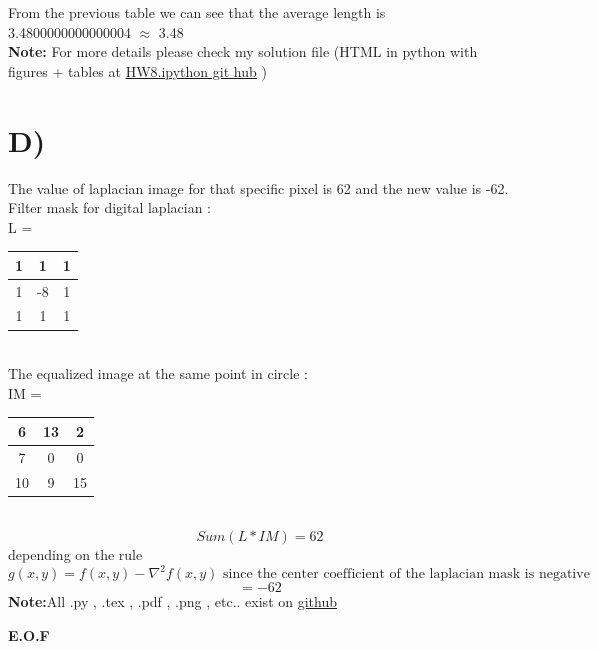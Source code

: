 \documentclass{article}
\begin{document}
From the previous table we can see that the average length is 3.4800000000000004 \(\approx\) 3.48\\
\textbf{Note:} For more details please check my solution file (HTML in python with figures + tables at \href{https://github.com/aqeel13932/IP/blob/master/hw8/HW8.ipynb}{HW8.ipython git hub} )
\section*{D)}
The value of laplacian image for that specific pixel is  62 and the new value is -62.\\
Filter mask for digital laplacian : \\
L = 
\begin{tabular}{|c|c|c|}
\hline
1&1&1 \\ \hline
1&-8&1 \\ \hline
1& 1&1 \\ \hline
\end{tabular} \\
The equalized image at the same point in circle : \\
IM = 
\begin{tabular}{|c|c|c|}
\hline
6&13&2 \\ \hline
7&0&0 \\ \hline
10&9&15 \\ \hline
\end{tabular} \\
\[Sum(L*IM) = 62\]
depending on the rule 
\[g(x,y)  = f(x,y)-\nabla^2 f(x,y) \text{ since the center coefficient of the laplacian mask is negative } \]
\[= -62\]
\textbf{Note:}All .py , .tex , .pdf , .png , etc.. exist on \href{https://github.com/aqeel13932/IP/tree/master/hw8}{github}
\begin{center}

\textbf{E.O.F}
\end{center}
\end{document}

